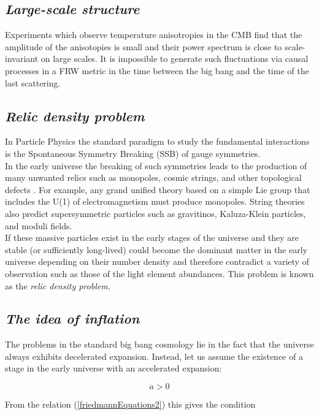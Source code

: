 \documentclass[11pt,a4paper,twoside]{book}
\begin{document}
\subsection*{\emph{Large-scale structure}}
Experiments which observe temperature anisotropies in the CMB find that the amplitude of the anisotopies is small and their power spectrum is close to scale-invariant on large scales. It is impossible to generate such fluctuations  via causal processes in a FRW metric in the time between the big bang and the time of the last scattering.

\subsection*{\emph{Relic density problem}}
In Particle Physics the standard paradigm to study the fundamental interactions is the Spontaneous Symmetry Breaking (SSB) of gauge symmetries.\\
In the early universe the breaking of such symmetries leads to the production of many unwanted relics such as monopoles, cosmic strings, and other topological defects \cite{TopDefects:Linde}. For example, any grand unified theory based on a simple Lie group that includes the U(1) of electromagnetism must produce monopoles. String theories also predict supersymmetric particles such as gravitinos, Kaluza-Klein particles, and moduli fields.\\
If these massive particles exist in the early stages of the universe and they are stable (or sufficiently long-lived) could become the dominant matter in the early universe depending on their number density and therefore contradict a variety of observation such as those of the light element abundances. This problem is known as the \textit{relic density problem}.

\subsection*{\emph{The idea of inflation}}

The problems in the standard big bang cosmology lie in the fact that the universe always exhibits decelerated expansion. Instead, let us assume  the existence of a stage in the early universe with an accelerated expansion: 

\begin{equation}
	\label{acc.expansion}
		\ddot{a} > 0
\end{equation}

From the relation (\ref{friedmannEquations2}) this gives the condition
\end{document}

